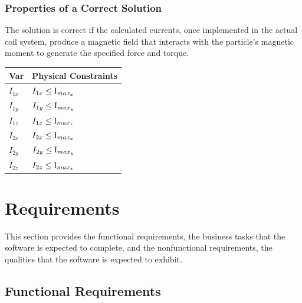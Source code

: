 \documentclass[12pt]{article}
\begin{document}
\subsubsection{Properties of a Correct Solution} \label{sec_CorrectSolution}

\noindent
 The solution is correct if the calculated currents, once implemented in the actual coil system, produce a magnetic field that interacts with the particle's magnetic moment to generate the specified force and torque.

\begin{table}[!h]
\caption{Output Variables} \label{TblOutputVar}
\renewcommand{\arraystretch}{1.2}
\noindent \begin{longtable*}{l l} 
  \toprule
  \textbf{Var} & \textbf{Physical Constraints} \\
  \midrule 
   $I_{1x}$ & $I_{1x} \leq \text I_{{max}_x}$\\
   $I_{1y}$ & $I_{1y} \leq \text I_{{max}_y}$\\
   $I_{1z}$ & $I_{1z} \leq \text I_{{max}_z}$\\
   $I_{2x}$ & $I_{2x} \leq \text I_{{max}_x}$\\
   $I_{2y}$ & $I_{2y} \leq \text I_{{max}_y}$\\
   $I_{2z}$ & $I_{2z} \leq \text I_{{max}_z}$\\
  \bottomrule
\end{longtable*}
\end{table}


\section{Requirements}

This section provides the functional requirements, the business tasks that the
software is expected to complete, and the nonfunctional requirements, the
qualities that the software is expected to exhibit.

\subsection{Functional Requirements}
\end{document}
